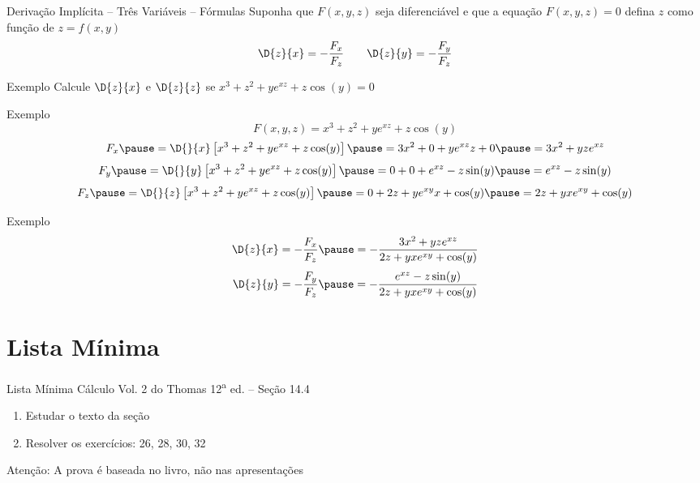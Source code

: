 \begin{frame}{Derivação Implícita -- Três Variáveis -- Fórmulas}
  Suponha que $F(x, y, z)$ seja diferenciável e que a equação $F(x, y, z)=0$
  defina $z$ como função de $z=f(x, y)$
  \[
    \D{z}{x} = -\frac{F_x}{F_z} \qquad
    \D{z}{y} = -\frac{F_y}{F_z}
  \]
\end{frame}

\addtocounter{exemplo}{1}
\begin{frame}{Exemplo \theexemplo}
  Calcule \(\D{z}{x}\) e \(\D{z}{z}\) se \(x^3 + z^2 + ye^{xz} + z\cos(y) = 0\)
\end{frame}

\begin{frame}{Exemplo \theexemplo}
  \[
    F(x, y, z) = x^3 + z^2 + ye^{xz} + z\cos(y)
  \]
  \pause
  \[
    F_x
    \pause
    = \D{}{x}\left[x^3 + z^2 + ye^{xz} + z\cos(y)\right]
    \pause
    = 3x^2 + 0 + ye^{xz}z + 0
    \pause
    = 3x^2 + yze^{xz}
  \]
  \pause
  \[
    F_y
    \pause
    = \D{}{y}\left[x^3 + z^2 + ye^{xz} + z\cos(y)\right]
    \pause
    = 0 + 0 + e^{xz} -z\sin(y)
    \pause
    = e^{xz} -z\sin(y)
  \]
  \pause
  \[
    F_z
    \pause
    = \D{}{z}\left[x^3 + z^2 + ye^{xz} + z\cos(y)\right]
    \pause
    = 0 + 2z + ye^{xy}x + \cos(y)
    \pause
    = 2z + yxe^{xy} + \cos(y)
  \]
\end{frame}

\begin{frame}{Exemplo \theexemplo}
  \[
    \D{z}{x}
    = -\frac{F_x}{F_z}
    \pause
    = -\frac{3x^2 + yze^{xz}}{2z + yxe^{xy} + \cos(y)}
  \]
  \pause
  \[
    \D{z}{y}
    = -\frac{F_y}{F_z}
    \pause
    = -\frac{e^{xz} -z\sin(y)}{2z + yxe^{xy} + \cos(y)}
  \]
\end{frame}

\section{Lista Mínima}

\begin{frame}{Lista Mínima}
  Cálculo Vol. 2 do Thomas 12\textsuperscript{a} ed. -- Seção 14.4
  \begin{enumerate}
    \item Estudar o texto da seção
    \item Resolver os exercícios: 26, 28, 30, 32
  \end{enumerate}

  \vfill
  Atenção: A prova é baseada no livro, não nas apresentações
\end{frame}


